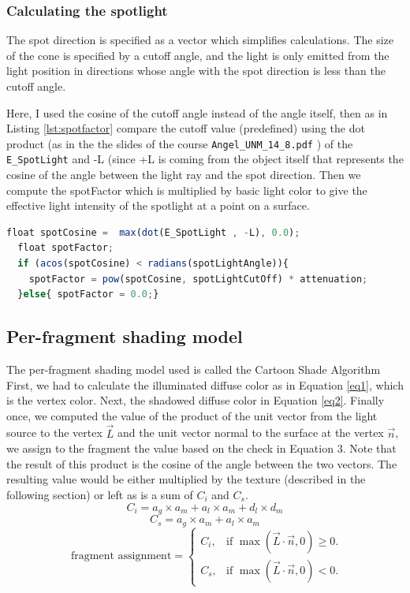 \documentclass[12pt,a4paper]{article}
\begin{document}
\subsubsection{Calculating the spotlight}
 The spot direction is specified as a vector which simplifies calculations. The size of the cone is specified by a cutoff angle, and the light is only emitted from the light position in directions whose angle with the spot direction is less than the cutoff angle. 
 
 Here, I used  the cosine of the cutoff angle instead of the angle itself, then as in Listing \ref{lst:spotfactor} compare the cutoff value (predefined) using the dot product (as in the the slides of the course \texttt{Angel\_UNM\_14\_8.pdf} ) of the \texttt{E\_SpotLight} and -L (since +L is coming from the object itself that represents the cosine of the angle between the light ray and the spot direction. Then we compute the spotFactor which is multiplied by basic light color to give the effective light intensity of the spotlight at a point on a surface.
 
 \begin{lstlisting}[caption={Spotfactor assignment},label={lst:spotfactor},language=JavaScript]
  float spotCosine =  max(dot(E_SpotLight , -L), 0.0);
  float spotFactor;
  if (acos(spotCosine) < radians(spotLightAngle)){
    spotFactor = pow(spotCosine, spotLightCutOff) * attenuation;
  }else{ spotFactor = 0.0;}
\end{lstlisting}

\subsection{Per-fragment shading model}
The per-fragment shading model used is called the Cartoon Shade Algorithm \cite{shade}
First, we had to calculate the illuminated diffuse color as in Equation \ref{eq1}, which is the vertex color. Next, the shadowed diffuse color in Equation \ref{eq2}. Finally once, we computed the value of the product of the unit vector from the light source to the vertex $\overrightarrow{L}$ and the unit vector
normal to the surface at the vertex  $\overrightarrow{n}$, we assign to the fragment the value based on the check in Equation 3. Note that the result of this product is the cosine of the angle between the two vectors. The resulting value would be either multiplied by the texture (described in the following section) or left as is a sum of $C_i$ and  $C_s$.
\begin{equation}\label{eq1}
C_i = a_g \times a_m + a_l \times a_m + d_l \times d_m  
\end{equation}
\begin{equation}\label{eq2}
C_s =  a_g \times a_m + a_l \times a_m
\end{equation}
\begin{equation}\label{eq3}
\text{ fragment assignment} =\begin{cases}
    C_i, & \text{if $\max(\overrightarrow{L} \cdot \overrightarrow{n}, 0)\geq0$}.\\
    C_s, & \text{if $\max(\overrightarrow{L} \cdot \overrightarrow{n}, 0)<0$}.
  \end{cases}
\end{equation}
\end{document}
